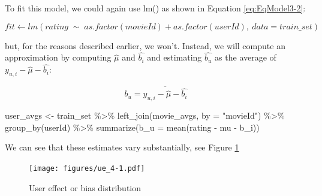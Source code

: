 \documentclass[
]{article}
\newenvironment{Shaded}{}{}
\newcommand{\AttributeTok}[1]{\textcolor[rgb]{0.49,0.56,0.16}{#1}}
\newcommand{\FunctionTok}[1]{\textcolor[rgb]{0.02,0.16,0.49}{#1}}
\newcommand{\NormalTok}[1]{#1}
\newcommand{\OtherTok}[1]{\textcolor[rgb]{0.00,0.44,0.13}{#1}}
\newcommand{\SpecialCharTok}[1]{\textcolor[rgb]{0.25,0.44,0.63}{#1}}
\newcommand{\StringTok}[1]{\textcolor[rgb]{0.25,0.44,0.63}{#1}}
\begin{document}
To fit this model, we could again use lm() as shown in Equation
\ref{eq:EqModel3-2}:

%
\par

\label{eq:EqModel3-2} \begin{equation}
  fit \leftarrow lm(rating \; \sim \; as.factor(movieId) + as.factor(userId), \: data = train\_{}set)
\end{equation}

but, for the reasons described earlier, we won't. Instead, we will
compute an approximation by computing \(\hat{\mu}\) and \(\hat{b_{i}}\)
and estimating \(\hat{b_{u}}\) as the average of
\(y_{u,i}-\hat{\mu}-\hat{b_{i}}\):

%
\par

\label{eq:EqModel3-3} \begin{equation}
  b_{u} = \overline{y_{u,i} - \hat{\mu} - \hat{b_{i}}}
\end{equation}

\newpage

\begin{Shaded}
\begin{Highlighting}[]
\NormalTok{user\_avgs }\OtherTok{\textless{}{-}}\NormalTok{ train\_set }\SpecialCharTok{\%\textgreater{}\%} \FunctionTok{left\_join}\NormalTok{(movie\_avgs, }\AttributeTok{by =} \StringTok{"movieId"}\NormalTok{) }\SpecialCharTok{\%\textgreater{}\%} 
    \FunctionTok{group\_by}\NormalTok{(userId) }\SpecialCharTok{\%\textgreater{}\%} \FunctionTok{summarize}\NormalTok{(}\AttributeTok{b\_u =} \FunctionTok{mean}\NormalTok{(rating }\SpecialCharTok{{-}}\NormalTok{ mu }\SpecialCharTok{{-}}\NormalTok{ b\_i))}
\end{Highlighting}
\end{Shaded}

We can see that these estimates vary substantially, see Figure
\ref{fig:model_3}

\begin{figure}
\centering
\texttt{[image: figures/ue\_4-1.pdf]}
\caption{User effect or bias distribution\label{fig:model_3}}
\end{figure}
\end{document}

